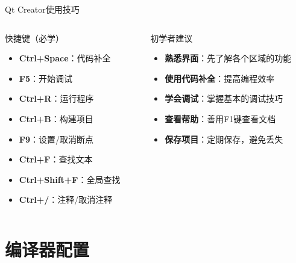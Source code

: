 \documentclass[UTF8,aspectratio=169]{beamer}
\begin{document}
\begin{frame}{Qt Creator使用技巧}
    \begin{columns}[onlytextwidth]
        \begin{column}{0.48\textwidth}
            \begin{ytublock}{快捷键（必学）}
                \begin{itemize}
                    \item \textbf{Ctrl+Space}：代码补全
                    \item \textbf{F5}：开始调试
                    \item \textbf{Ctrl+R}：运行程序
                    \item \textbf{Ctrl+B}：构建项目
                    \item \textbf{F9}：设置/取消断点
                    \item \textbf{Ctrl+F}：查找文本
                    \item \textbf{Ctrl+Shift+F}：全局查找
                    \item \textbf{Ctrl+/}：注释/取消注释
                \end{itemize}
            \end{ytublock}
        \end{column}
        \hspace{0.02\textwidth}
        \begin{column}{0.48\textwidth}
            \begin{ytublock}{初学者建议}
                \begin{itemize}
                    \item \textbf{熟悉界面}：先了解各个区域的功能
                    \item \textbf{使用代码补全}：提高编程效率
                    \item \textbf{学会调试}：掌握基本的调试技巧
                    \item \textbf{查看帮助}：善用F1键查看文档
                    \item \textbf{保存项目}：定期保存，避免丢失
                \end{itemize}
            \end{ytublock}
        \end{column}
    \end{columns}
\end{frame}

\section{编译器配置}
\end{document}

